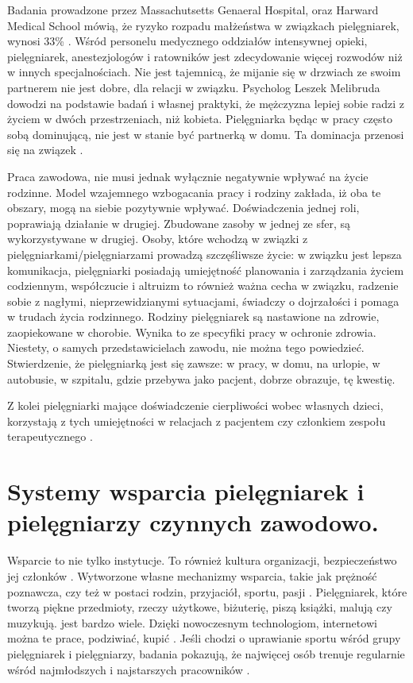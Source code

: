 \documentclass[a4paper,12pt,twoside,openany]{report}
\begin{document}
Badania prowadzone przez Massachutsetts Genaeral Hospital, oraz Harward Medical School mówią, że ryzyko rozpadu małżeństwa w związkach pielęgniarek, wynosi 33\% \cite{rozwody}.  Wśród personelu medycznego oddziałów intensywnej opieki, pielęgniarek, anestezjologów i ratowników jest zdecydowanie więcej rozwodów niż w innych specjalnościach.  Nie jest tajemnicą, że mijanie się w drzwiach ze swoim partnerem nie jest dobre, dla relacji w związku. Psycholog Leszek Melibruda dowodzi na podstawie badań i własnej praktyki, że mężczyzna lepiej sobie radzi z życiem w dwóch przestrzeniach, niż kobieta. Pielęgniarka będąc w pracy często sobą dominującą, nie jest w stanie być partnerką w domu. Ta dominacja przenosi się na związek \cite{melibruda}.

Praca zawodowa, nie musi jednak wyłącznie negatywnie wpływać na życie rodzinne. Model wzajemnego wzbogacania pracy i rodziny zakłada, iż oba te obszary, mogą na siebie pozytywnie wpływać. Doświadczenia jednej roli, poprawiają działanie w drugiej. Zbudowane zasoby w jednej ze sfer, są wykorzystywane w drugiej.  Osoby, które wchodzą w związki z pielęgniarkami/pielęgniarzami prowadzą szczęśliwsze życie: w związku jest lepsza komunikacja, pielęgniarki posiadają umiejętność planowania i zarządzania życiem codziennym, współczucie i altruizm to również ważna cecha w związku, radzenie sobie z nagłymi, nieprzewidzianymi sytuacjami, świadczy o dojrzałości i pomaga w trudach życia rodzinnego. Rodziny pielęgniarek są nastawione na zdrowie, zaopiekowane w chorobie. Wynika to ze specyfiki pracy w ochronie zdrowia. Niestety, o samych przedstawicielach zawodu, nie można tego powiedzieć. Stwierdzenie, że pielęgniarką jest się zawsze: w pracy, w domu, na urlopie, w autobusie, w szpitalu, gdzie przebywa jako pacjent, dobrze obrazuje, tę kwestię.

Z kolei pielęgniarki mające doświadczenie cierpliwości wobec własnych dzieci, korzystają z tych umiejętności w relacjach z pacjentem czy członkiem zespołu terapeutycznego \cite{wzbogacanie}.

\section{Systemy wsparcia pielęgniarek i pielęgniarzy czynnych zawodowo.}
\label{sectionSystemyWsparcia}
Wsparcie to nie tylko instytucje. To również kultura organizacji, bezpieczeństwo jej członków \cite{bezpieczeństwo}. Wytworzone własne mechanizmy wsparcia, takie jak  prężność poznawcza, czy też w postaci  rodzin, przyjaciół, sportu, pasji \cite{prężność}. Pielęgniarek, które tworzą piękne przedmioty, rzeczy użytkowe, biżuterię, piszą książki, malują czy muzykują. jest bardzo wiele. Dzięki nowoczesnym technologiom, internetowi można te prace, podziwiać, kupić \cite{talent}. Jeśli chodzi o uprawianie sportu wśród grupy pielęgniarek i pielęgniarzy, badania pokazują, że najwięcej osób trenuje regularnie wśród najmłodszych i najstarszych pracowników \cite{sport}.
\end{document}
